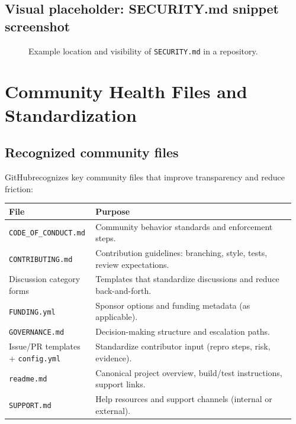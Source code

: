 \documentclass[11pt]{article}
\newcommand{\gh}{\textsf{GitHub}}
\begin{document}
\subsection{Visual placeholder: SECURITY.md snippet screenshot}
\begin{figure}[!htbp]
\centering
{}
\caption{Example location and visibility of \texttt{SECURITY.md} in a repository.}
\end{figure}

\section{Community Health Files and Standardization}

\subsection{Recognized community files}
\gh recognizes key community files that improve transparency and reduce friction:

\begin{longtable}{@{}p{0.28\linewidth}p{0.68\linewidth}@{}}
\toprule
\textbf{File} & \textbf{Purpose} \\
\midrule
\endhead

\texttt{CODE\_OF\_CONDUCT.md} & Community behavior standards and enforcement steps. \\
\texttt{CONTRIBUTING.md} & Contribution guidelines: branching, style, tests, review expectations. \\
Discussion category forms & Templates that standardize discussions and reduce back-and-forth. \\
\texttt{FUNDING.yml} & Sponsor options and funding metadata (as applicable). \\
\texttt{GOVERNANCE.md} & Decision-making structure and escalation paths. \\
Issue/PR templates + \texttt{config.yml} & Standardize contributor input (repro steps, risk, evidence). \\
\texttt{readme.md} & Canonical project overview, build/test instructions, support links. \\
\texttt{SUPPORT.md} & Help resources and support channels (internal or external). \\
\bottomrule
\end{longtable}
\end{document}
